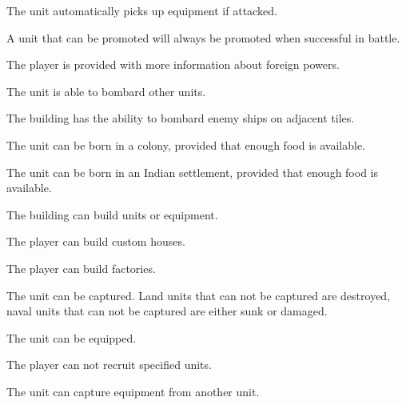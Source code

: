 \documentclass[12pt]{book}
\begin{document}
The unit automatically picks up equipment if attacked.

\affectsUnit

A unit that can be promoted will always be promoted when successful in
battle.

\affectsPlayer

The player is provided with more information about foreign powers.

\affectsUnit

The unit is able to bombard other units.

\affectsBuilding

The building has the ability to bombard enemy ships on adjacent tiles.

\affectsUnit

The unit can be born in a colony, provided that enough food is available.

\affectsUnit

The unit can be born in an Indian settlement, provided that enough food is available.

\affectsBuilding

The building can build units or equipment.

\affectsPlayer

The player can build custom houses.

\affectsPlayer

The player can build factories.

\affectsUnit

The unit can be captured. Land units that can not be captured are
destroyed, naval units that can not be captured are either sunk or
damaged.

\affectsUnit

The unit can be equipped.

\affectsPlayer

The player can not recruit specified units.

\affectsUnit

The unit can capture equipment from another unit.
\end{document}
